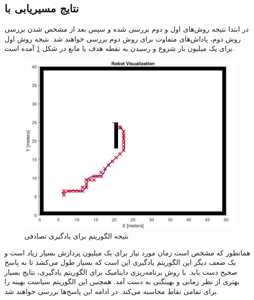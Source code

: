 \subsection{نتایج مسیریابی با }
در ابتدا نتیجه روش‌های اول و دوم بررسی شده و سپس بعد از مشخص شدن بررسی روش دوم، پاداش‌های متفاوت برای روش دوم بررسی خواهند شد. نتیجه روش اول برای یک میلیون بار شروع و رسیدن به نقطه هدف یا مانع  در شکل \ref{Fig QL random} آمده است.
\begin{figure}[!h]
	\centering
	\includegraphics[scale=0.35]{Images/QL path.jpg}
	\caption{نتیجه الگوریتم  برای یادگیری تصادفی}\label{Fig QL random}
\end{figure}

همانطور که مشخص است زمان مورد نیاز برای یک میلیون پردازش بسیار زیاد است و یک ضعف دیگر این الگوریتم یادگیری این است که بسیار طول می‌کشد تا به پاسخ صحیح دست یابد. با روش برنامه‌ریزی داینامیک برای الگوریتم یادگیری، نتایج بسیار بهتری از نظر زمانی و بهینگنی به دست آمد. همچنین این الگوریتم سیاست بهینه را برای تمامی نقاط محاسبه می‌کند. در ادامه این پاسخ‌ها بررسی خواهند شد.

